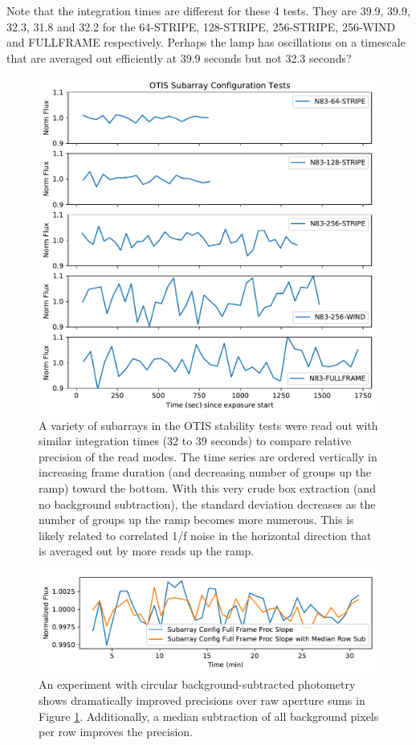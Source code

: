 \documentclass{aastex62}
\begin{document}
Note that the integration times are different for these 4 tests. They are 39.9, 39.9, 32.3, 31.8 and 32.2 for the 64-STRIPE, 128-STRIPE, 256-STRIPE, 256-WIND and FULLFRAME respectively. Perhaps the lamp has oscillations on a timescale that are averaged out efficiently at 39.9 seconds but not 32.3 seconds?

\begin{figure}[!hbtp]
\centering
\includegraphics[width=.5\columnwidth]{subarray_config_tser.pdf}
\caption{A variety of subarrays in the OTIS stability tests were read out with similar integration times (32 to 39 seconds) to compare relative precision of the read modes. 
The time series are ordered vertically in increasing frame duration (and decreasing number of groups up the ramp) toward the bottom.
With this very crude box extraction (and no background subtraction), the standard deviation decreases as the number of groups up the ramp becomes more numerous.
This is likely related to correlated 1/f noise in the horizontal direction that is averaged out by more reads up the ramp.}\label{fig:OTISsubarrays}
\end{figure}

\begin{figure}[!hbtp]
\centering
\includegraphics[width=.5\columnwidth]{fullframe_background_sub_compare_tser_tools.pdf}
\caption{An experiment with circular background-subtracted photometry shows dramatically improved precisions over raw aperture sums in Figure \ref{fig:OTISsubarrays}.
Additionally, a median subtraction of all background pixels per row improves the precision.}\label{fig:OTISSubConfigCircularAp}
\end{figure}
\end{document}
